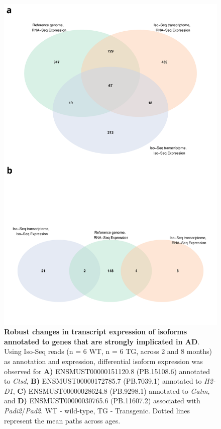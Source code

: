 \begin{figure}[!htp]
	\centering
	\includegraphics[page=18,scale = 0.55]{Figures/WholeDifferentialAnalysis.pdf}
	\captionsetup{width=0.95\textwidth}
	\caption[Robust changes in transcript expression of isoforms annotated to genes that are strongly implicated in AD]%
	{\textbf{Robust changes in transcript expression of isoforms annotated to genes that are strongly implicated in AD}. Using Iso-Seq reads (n = 6 WT, n = 6 TG, across 2 and 8 months) as annotation and expression, differential isoform expression was observed for \textbf{A)} ENSMUST00000151120.8 (PB.15108.6) annotated to \textit{Ctsd}, \textbf{B)} ENSMUST00000172785.7 (PB.7039.1) annotated to \textit{H2-D1}, \textbf{C)} ENSMUST00000028624.8 (PB.9298.1) annotated to \textit{Gatm}, and \textbf{D)} ENSMUST00000030765.6 (PB.11607.2) associated with \textit{Padi2}/\textit{Pad2}.  WT - wild-type, TG - Transgenic. Dotted lines represent the mean paths across ages.}    
	\label{fig:DEI_ADgenes_isoseq}
\end{figure}

